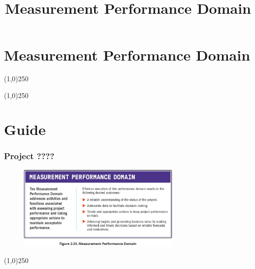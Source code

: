 



%
\title[Project Management \& BIM]{Measurement Performance Domain}



%
\usetikzlibrary{arrows}



\newpage




\thispagestyle{empty}
\tableofcontents
\newpage
\section{Measurement Performance Domain}


\begin{frame}
\titlepage
\end{frame}\begin{center}\line(1,0){250}\end{center}
%
%
\begin{center}\line(1,0){250}\end{center}


\section{Guide}



\begin{frame}
\frametitle{Project ????}
 \begin{figure}
    \centering
        \includegraphics[width = 8cm]{../images/guide/Fig2-23.jpg}
    \label{guidefig:2-23}
 \end{figure}
\end{frame}
\begin{center}\line(1,0){250}\end{center}

